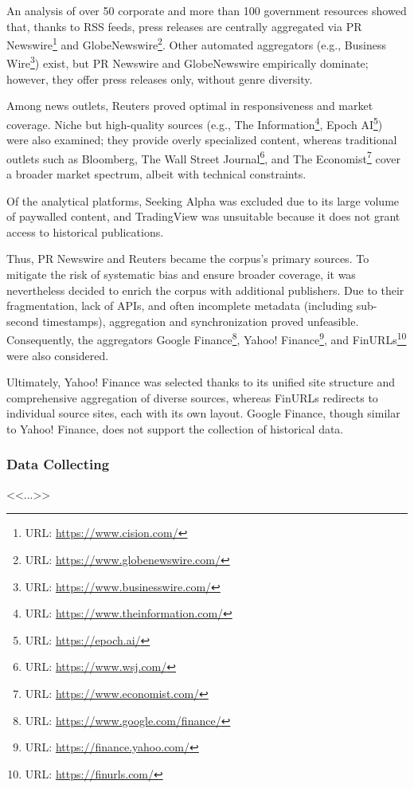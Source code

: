 An analysis of over 50 corporate and more than 100 government resources showed that, thanks to RSS feeds, press
releases are centrally aggregated via PR Newswire\footnote{URL: \url{https://www.cision.com/}} and
GlobeNewswire\footnote{URL: \url{https://www.globenewswire.com/}}. Other automated aggregators
(e.g., Business Wire\footnote{URL: \url{https://www.businesswire.com/}}) exist, but PR Newswire and GlobeNewswire
empirically dominate; however, they offer press releases only, without genre diversity.

Among news outlets, Reuters proved optimal in responsiveness and market coverage. Niche but high-quality sources
(e.g., The Information\footnote{URL: \url{https://www.theinformation.com/}}, Epoch AI\footnote{URL: \url{https://epoch.ai/}})
were also examined; they provide overly specialized content, whereas traditional outlets
such as Bloomberg, The Wall Street Journal\footnote{URL: \url{https://www.wsj.com/}},
and The Economist\footnote{URL: \url{https://www.economist.com/}} cover a broader market spectrum, albeit with
technical constraints.

Of the analytical platforms, Seeking Alpha was excluded due to its large volume of paywalled content, and TradingView
was unsuitable because it does not grant access to historical publications.

Thus, PR Newswire and Reuters became the corpus's primary sources. To mitigate the risk of systematic bias and ensure
broader coverage, it was nevertheless decided to enrich the corpus with additional publishers. Due to their fragmentation,
lack of APIs, and often incomplete metadata (including sub-second timestamps), aggregation and synchronization proved
unfeasible. Consequently, the aggregators Google Finance\footnote{URL: \url{https://www.google.com/finance/}},
Yahoo! Finance\footnote{URL: \url{https://finance.yahoo.com/}},
and FinURLs\footnote{URL: \url{https://finurls.com/}} were also considered.

Ultimately, Yahoo! Finance was selected thanks to its unified site structure and comprehensive aggregation of diverse
sources, whereas FinURLs redirects to individual source sites, each with its own layout. Google Finance, though similar
to Yahoo! Finance, does not support the collection of historical data.

\subsubsection{Data Collecting}
\label{sec:data_collecting}
<<...>>

